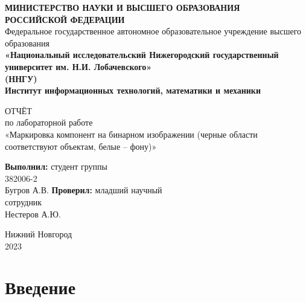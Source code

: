 \documentclass[14pt]{extarticle}
\title{}
\author{}
\date{}
\begin{document}
	\begin{titlepage}
		\begin{center}
			{\bfseries МИНИСТЕРСТВО НАУКИ И ВЫСШЕГО ОБРАЗОВАНИЯ \\
				РОССИЙСКОЙ ФЕДЕРАЦИИ}
			\\
			Федеральное государственное автономное образовательное учреждение высшего образования
			\\
			{\bfseries «Национальный исследовательский Нижегородский государственный университет им. Н.И. Лобачевского»\\(ННГУ)
				\\Институт информационных технологий, математики и механики} \\
		\end{center}

		\vspace{8em}

		\begin{center}
			ОТЧЁТ \\ по лабораторной работе \\
			«Маркировка компонент на бинарном изображении (черные области соответствуют объектам, белые – фону)»
		\end{center}

		\vspace{5em}


		\begin{flushright}
			{\bfseries Выполнил:} студент группы\\382006-2\\Бугров А.В. \underline{\hspace{3cm}} \linebreak\linebreak\linebreak
			{\bfseries Проверил:} младший научный\\ сотрудник\\Нестеров А.Ю. \underline{\hspace{3cm}} 
		\end{flushright}


		\vspace{\fill}

		\begin{center}
			Нижний Новгород\\2023
		\end{center}

	\end{titlepage}
 \newpage
\tableofcontents
\newpage
\section{Введение}
\end{document}

